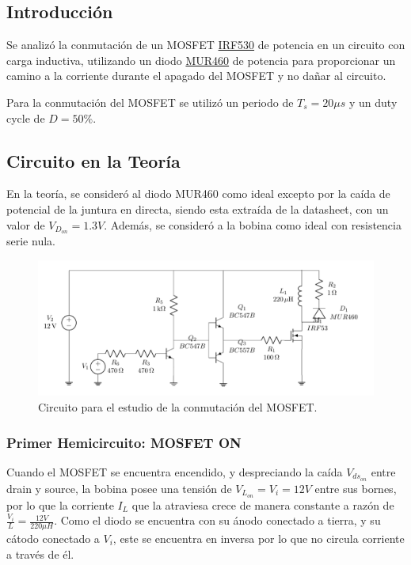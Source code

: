 



\subsection{Introducción}

Se analizó la conmutación de un MOSFET \href{https://www.vishay.com/docs/91019/91019.pdf}{IRF530} de potencia en un circuito con carga inductiva, utilizando un diodo \href{https://www.onsemi.com/pdf/datasheet/mur420-d.pdf}{MUR460} de potencia para proporcionar un camino a la corriente durante el apagado del MOSFET y no dañar al circuito.


Para la conmutación del MOSFET se utilizó un periodo de $T_s = 20 \mu s$ y un duty cycle de $D = 50 \%$.

\subsection{Circuito en la Teoría}

En la teoría, se consideró al diodo MUR460 como ideal excepto por la caída de potencial de la juntura en directa, siendo esta extraída de la datasheet, con un valor de $V_{D_{on}} = 1.3V$. Además, se consideró a la bobina como ideal con resistencia serie nula.

\begin{figure}[H]
	\centering
	\includegraphics[width=0.7\linewidth, page=1]{ImagenesEjercicio-1/CircuitsEj1}
	\caption{Circuito para el estudio de la conmutación del MOSFET.}
	\label{fig:ej1:circuito}
\end{figure}

\subsubsection{Primer Hemicircuito: MOSFET ON}

Cuando el MOSFET se encuentra encendido, y despreciando la caída $V_{ds_{on}}$ entre drain y source, la bobina posee una tensión de $V_{L_{on}} = V_i = 12V$ entre sus bornes, por lo que la corriente $I_L$ que la atraviesa crece de manera constante a razón de $\frac{V_i}{L} = \frac{12V}{220\mu H}$. Como el diodo se encuentra con su ánodo conectado a tierra, y su cátodo conectado a $V_i$, este se encuentra en inversa por lo que no circula corriente a través de él.


